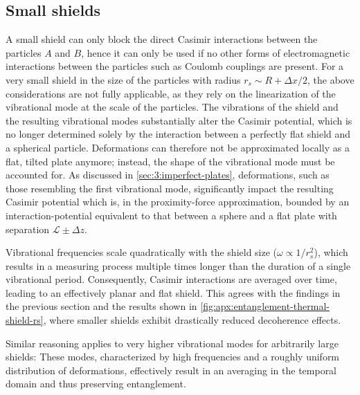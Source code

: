 \subsection{Small shields}
A small shield can only block the direct Casimir interactions between the particles $A$ and $B$, hence it can only be used if no other forms of electromagnetic interactions between the particles such as Coulomb couplings are present.
For a very small shield in the size of the particles with radius $r_s \sim R + \Delta x / 2$, the above considerations are not fully applicable, as they rely on the linearization of the vibrational mode at the scale of the particles.
The vibrations of the shield and the resulting vibrational modes substantially alter the Casimir potential, which is no longer determined solely by the interaction between a perfectly flat shield and a spherical particle. 
Deformations can therefore not be approximated locally as a flat, tilted plate anymore; instead, the shape of the vibrational mode must be accounted for. 
As discussed in \cref{sec:3:imperfect-plates}, deformations, such as those resembling the first vibrational mode, significantly impact the resulting Casimir potential which is, in the proximity-force approximation, bounded by an interaction-potential equivalent to that between a sphere and a flat plate with separation $\mathscr{L} \pm \Delta z$.

Vibrational frequencies scale quadratically with the shield size ($\omega \propto 1/r_s^2$), which results in a measuring process multiple times longer than the duration of a single vibrational period. 
Consequently, Casimir interactions are averaged over time, leading to an effectively planar and flat shield.
This agrees with the findings in the previous section and the results shown in \cref{fig:apx:entanglement-thermal-shield-rs}, where smaller shields exhibit drastically reduced decoherence effects.

Similar reasoning applies to very higher vibrational modes for arbitrarily large shields:
These modes, characterized by high frequencies and a roughly uniform distribution of deformations, effectively result in an averaging in the temporal domain and thus preserving entanglement.
